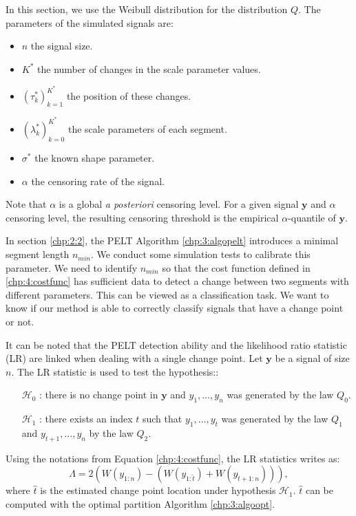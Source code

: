 In this section, we use the Weibull distribution for the distribution $Q$. The parameters of the simulated signals are:
\begin{itemize}
\item $n$ the signal size.
\item $K^*$ the number of changes in the scale parameter values.
\item $(\tau^*_k)_{k = 1}^{K^*}$ the position of these changes.
\item $(\lambda^*_k)_{k = 0}^{K^*}$ the scale parameters of each segment.
\item $\sigma^*$ the known shape parameter.
\item $\alpha$ the censoring rate of the signal.
\end{itemize}
Note that $\alpha$ is a global \textit{a posteriori} censoring level. For a given signal $\bm y$ and $\alpha$ censoring level, the resulting censoring threshold is the empirical $\alpha$-quantile of $\bm y$.   
\newline

In section \ref{chp:2:2}, the PELT Algorithm \ref{chp:3:algopelt} introduces a minimal segment length $n_{min}$. We conduct some simulation tests to calibrate this parameter. We need to identify $n_{min}$ so that the cost function defined in \eqref{chp:4:costfunc} has sufficient data to detect a change between two segments with different parameters. This can be viewed as a classification task. We want to know if our method is able to correctly classify signals that have a change point or not.  

It can be noted that the PELT detection ability and the likelihood ratio statistic (LR) are linked when dealing with a single change point. Let $\bm y$ be a signal of size $n$. The LR statistic is used to test the hypothesis::
\begin{itemize}
\item[$\mathcal{H}_0$]: there is no change point in $\bm y$ and $y_1,\dots,y_n$ was generated by the law $Q_0$.
\item[$\mathcal{H}_1$]: there exists an index $t$ such that $y_1,\dots,y_t$ was generated by the law $Q_1$ and $y_{t+1},\dots,y_{n}$ by the law $Q_2$.
\end{itemize}
Using the notations from Equation \eqref{chp:4:costfunc}, the LR statistics writes as:
\begin{equation}\label{chp:4:LR}
\Lambda = 2(W(y_{1:n})-(W(y_{1:\widehat{t}})+W(y_{\widehat{t}+1:n}))),
\end{equation} 
where $\widehat{t}$ is the estimated change point location under hypothesis $\mathcal{H}_1$. $\widehat{t}$ can be computed with the optimal partition Algorithm \ref{chp:3:algoopt}.  

